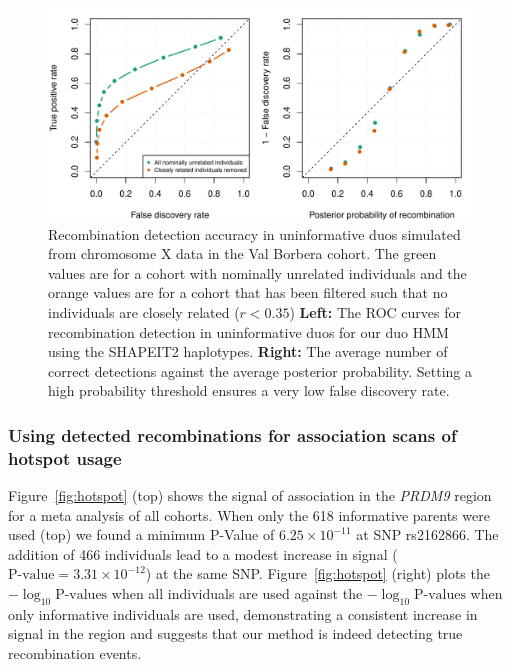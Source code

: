 \begin{figure}[h]
 \begin{center} 
  \includegraphics[width=\textwidth]{chap4figs/Fig6}
   \caption[Recombination detection accuracy in simulated uninformative duos]{ Recombination detection accuracy in uninformative duos simulated from chromosome X data in the Val Borbera cohort.  The green values are for a cohort with nominally unrelated individuals and the orange values are for a cohort that has been filtered such that no individuals are closely related ($r<0.35$)     
     \textbf{Left:} The ROC curves for recombination detection
     in uninformative duos  for our duo HMM using the SHAPEIT2 haplotypes.
     \textbf{Right:} The average number of correct detections against
     the average posterior probability.  Setting a high probability threshold ensures a very low false discovery rate.
\label{fig:roc}}
 \end{center} 
\end{figure}

\clearpage
\subsubsection{Using detected recombinations for association scans of hotspot usage} Figure~\ref{fig:hotspot} (top) shows the signal of association in the \emph{PRDM9} region for a meta analysis of all cohorts.  When only the 618 informative parents were used (top) we found a minimum P-Value of $6.25 \times 10^{-11}$ at SNP rs2162866. The addition of 466 individuals lead to a modest increase in signal ($\textrm{P-value}=3.31\times 10^{-12}$) at the same SNP. Figure~\ref{fig:hotspot} (right) plots the $-\log_{10}\textrm{P-values}$  when all individuals are used against the $-\log_{10}\textrm{P-values}$  when only informative individuals are used, demonstrating a consistent increase in signal in the region and suggests that our method is indeed detecting true recombination events.

